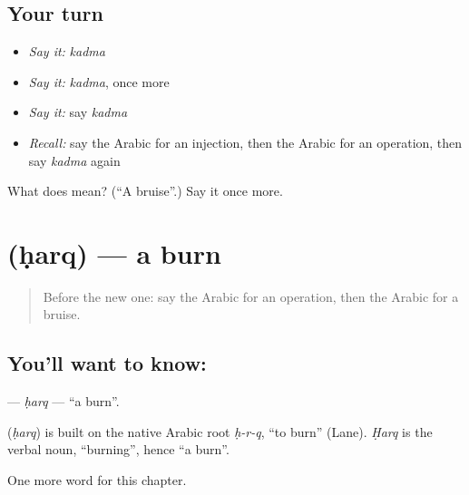 \subsection*{Your turn}
\begin{itemize}
\raggedright
  \item \emph{Say it:} \emph{kadma}
  \item \emph{Say it:} \emph{kadma}, once more
  \item \emph{Say it:} say \emph{kadma}
  \item \emph{Recall:} say the Arabic for an injection, then the Arabic for an operation, then say \emph{kadma} again
\end{itemize}

\begin{tcolorbox}[breakable,colback=teal!4,colframe=teal!35!black,title={Before you move on}]
What does  mean? (\textquotedblleft{}A bruise\textquotedblright{}.) Say it once more.
\end{tcolorbox}
\section[\texorpdfstring{\ar{حرق} (ḥarq)}{حرق (ḥarq)}]{ (ḥarq) — a burn}

\label{lesson:AR-C201-harq}



\begin{quote}
Before the new one: say the Arabic for an operation, then the Arabic for a bruise.
\end{quote}

\subsection*{You'll want to know: }
\textbf{} — \emph{ḥarq} — \textquotedblleft{}a burn\textquotedblright{}.

\begin{cousinweb}
\textbf{} (\emph{ḥarq}) is built on the native Arabic root \emph{ḥ-r-q}, \textquotedblleft{}to burn\textquotedblright{} (Lane). \emph{Ḥarq} is the verbal noun, \textquotedblleft{}burning\textquotedblright{}, hence \textquotedblleft{}a burn\textquotedblright{}.
\end{cousinweb}

\begin{grammarlens}[title={What you've built}]
One more word for this chapter.
\end{grammarlens}

